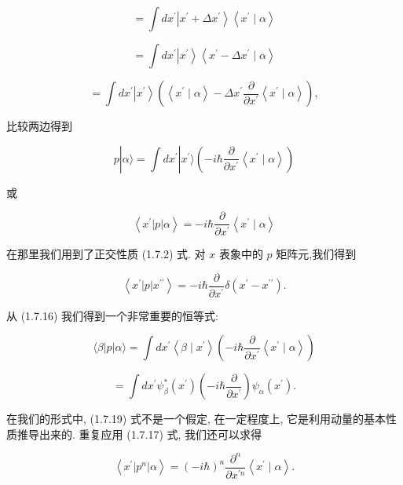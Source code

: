 \documentclass[lang=cn,newtx,10pt,scheme=chinese,thmcnt=section]{elegantbook}
\begin{document}
$$
= \int d{x}^{\prime }\left| {{x}^{\prime } + \Delta {x}^{\prime }}\right\rangle \left\langle {{x}^{\prime } \mid \alpha }\right\rangle \tag{1.7.15}
$$

$$
= \int d{x}^{\prime }\left| {x}^{\prime }\right\rangle \left\langle {{x}^{\prime } - \Delta {x}^{\prime } \mid \alpha }\right\rangle
$$

$$
= \int d{x}^{\prime }\left| {x}^{\prime }\right\rangle \left( {\left\langle {{x}^{\prime } \mid \alpha }\right\rangle - \Delta {x}^{\prime }\frac{\partial }{\partial {x}^{\prime }}\left\langle {{x}^{\prime } \mid \alpha }\right\rangle }\right) ,
$$

比较两边得到

$$
p\left| {\alpha \rangle = \int d{x}^{\prime }}\right| {x}^{\prime }\rangle \left( {-i\hbar \frac{\partial }{\partial {x}^{\prime }}\left\langle {{x}^{\prime } \mid \alpha }\right\rangle }\right) \tag{1.7.16}
$$

或

$$
\left\langle {{x}^{\prime }\left| p\right| \alpha }\right\rangle = - i\hbar \frac{\partial }{\partial {x}^{\prime }}\left\langle {{x}^{\prime } \mid \alpha }\right\rangle \tag{1.7.17}
$$

在那里我们用到了正交性质 (1.7.2) 式. 对 $x$ 表象中的 $p$ 矩阵元,我们得到

$$
\left\langle {{x}^{\prime }\left| p\right| {x}^{\prime \prime }}\right\rangle = - i\hbar \frac{\partial }{\partial {x}^{\prime }}\delta \left( {{x}^{\prime } - {x}^{\prime \prime }}\right) . \tag{1.7.18}
$$

从 (1.7.16) 我们得到一个非常重要的恒等式:

$$
\langle \beta \left| p\right| \alpha \rangle = \int d{x}^{\prime }\left\langle {\beta \mid {x}^{\prime }}\right\rangle \left( {-i\hbar \frac{\partial }{\partial {x}^{\prime }}\left\langle {{x}^{\prime } \mid \alpha }\right\rangle }\right) \tag{1.7.19}
$$

$$
= \int d{x}^{\prime }{\psi }_{\beta }^{ * }\left( {x}^{\prime }\right) \left( {-i\hbar \frac{\partial }{\partial {x}^{\prime }}}\right) {\psi }_{\alpha }\left( {x}^{\prime }\right) .
$$

在我们的形式中, (1.7.19) 式不是一个假定, 在一定程度上, 它是利用动量的基本性质推导出来的. 重复应用 (1.7.17) 式, 我们还可以求得

$$
\left\langle {{x}^{\prime }\left| {p}^{n}\right| \alpha }\right\rangle = {\left( -i\hbar \right) }^{n}\frac{{\partial }^{n}}{\partial {x}^{\prime n}}\left\langle {{x}^{\prime } \mid \alpha }\right\rangle . \tag{1. 7.20}
$$
\end{document}
